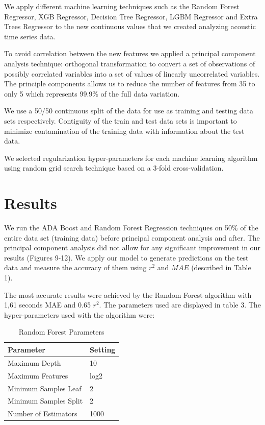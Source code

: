 \documentclass[]{llncs} %
\begin{document}
We apply different machine learning techniques such as the Random Forest Regressor, XGB Regressor,  Decision Tree Regressor, LGBM Regressor and Extra Trees Regressor to the new continuous values that we created analyzing acoustic time series data. \par
To avoid correlation between the new features we applied a principal component analysis technique: orthogonal transformation to convert a set of observations of possibly correlated variables into a set of values of linearly uncorrelated variables. The principle components allows us to reduce the number of features from 35 to only 5 which represents 99.9\% of the full data variation. \par
We use a 50/50 continuous split of the data for use as training and testing data sets respectively. Contiguity of the train and test data sets is important to minimize contamination of the training data with information about the test data. \par
We selected regularization hyper-parameters for each machine learning algorithm using random grid search technique based on a 3-fold cross-validation.
\section{Results}
We run the ADA Boost and Random Forest Regression techniques on 50\% of the entire data set (training data) before principal component analysis and after. The principal component analysis did not allow for any significant improvement in our results (Figures 9-12). We apply our model to generate predictions on the test data and measure the accuracy of them using $r^2$ and $MAE$ (described in Table 1). \par 

The most accurate results were achieved by the Random Forest algorithm with 1,61 seconds MAE and 0.65 $r^2$. The parameters used are displayed in table 3. %
The hyper-parameters used with the algorithm  were:

\begin{table}
	\begin{center}
		\caption{Random Forest Parameters}
		\label{tab:hyperparameters}
		\begin{tabular}{l|l} 
			\textbf{Parameter} & \textbf{Setting}\\
			\hline
			Maximum Depth & 10 \\ 
			Maximum Features & log2 \\ 
			Minimum Samples Leaf & 2 \\ 
			Minimum Samples Split & 2 \\ 
			Number of Estimators & 1000 \\
		\end{tabular}
	\end{center}
\end{table}
\end{document}
